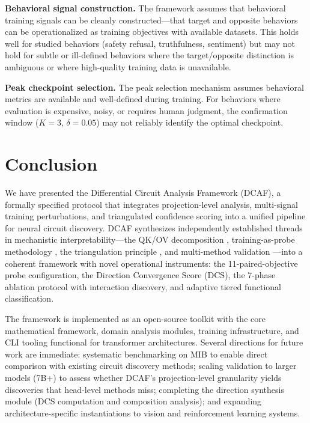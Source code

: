 \documentclass[11pt]{article}
\begin{document}
\textbf{Behavioral signal construction.} The framework assumes that behavioral training signals can be cleanly constructed---that target and opposite behaviors can be operationalized as training objectives with available datasets. This holds well for studied behaviors (safety refusal, truthfulness, sentiment) but may not hold for subtle or ill-defined behaviors where the target/opposite distinction is ambiguous or where high-quality training data is unavailable.

\textbf{Peak checkpoint selection.} The peak selection mechanism assumes behavioral metrics are available and well-defined during training. For behaviors where evaluation is expensive, noisy, or requires human judgment, the confirmation window ($K=3$, $\delta=0.05$) may not reliably identify the optimal checkpoint.


\section{Conclusion}
\label{sec:conclusion}

We have presented the Differential Circuit Analysis Framework (DCAF), a formally specified protocol that integrates projection-level analysis, multi-signal training perturbations, and triangulated confidence scoring into a unified pipeline for neural circuit discovery. DCAF synthesizes independently established threads in mechanistic interpretability---the QK/OV decomposition \citep{elhage2021mathematical}, training-as-probe methodology \citep{prakash2024finetuning,tigges2024consistent}, the triangulation principle \citep{long2025triangulation,sharkey2025openproblems}, and multi-method validation \citep{mondorf2025ensemble}---into a coherent framework with novel operational instruments: the 11-paired-objective probe configuration, the Direction Convergence Score (DCS), the 7-phase ablation protocol with interaction discovery, and adaptive tiered functional classification.

The framework is implemented as an open-source toolkit with the core mathematical framework, domain analysis modules, training infrastructure, and CLI tooling functional for transformer architectures. Several directions for future work are immediate: systematic benchmarking on MIB \citep{mueller2025mib} to enable direct comparison with existing circuit discovery methods; scaling validation to larger models (7B+) to assess whether DCAF's projection-level granularity yields discoveries that head-level methods miss; completing the direction synthesis module (DCS computation and composition analysis); and expanding architecture-specific instantiations to vision and reinforcement learning systems.
\end{document}
